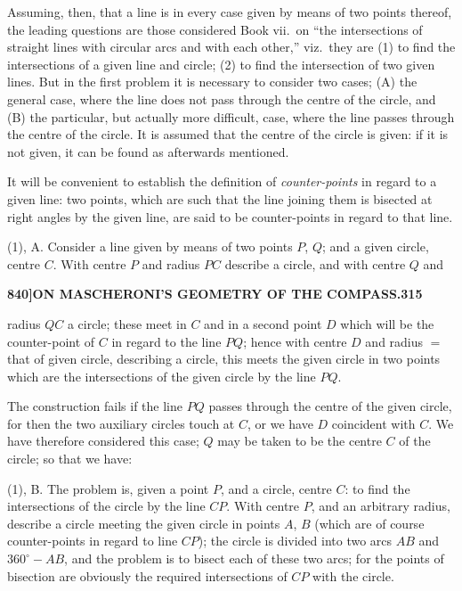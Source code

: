 \documentclass[11pt]{article}
\begin{document}
\medskip

Assuming, then, that a line is in every case given by means of two points thereof, the leading questions are those considered Book vii.\ on ``the intersections of straight lines with circular arcs and with each other,'' viz.\ they are (1) to find the intersections of a given line and circle; (2) to find the intersection of two given lines. But in the first problem it is necessary to consider two cases; (A) the general case, where the line does not pass through the centre of the circle, and (B) the particular, but actually more difficult, case, where the line passes through the centre of the circle. It is assumed that the centre of the circle is given: if it is not given, it can be found as afterwards mentioned.

\medskip

It will be convenient to establish the definition of \textit{counter-points} in regard to a given line: two points, which are such that the line joining them is bisected at right angles by the given line, are said to be counter-points in regard to that line.

\medskip

(1), A. Consider a line given by means of two points $P$, $Q$; and a given circle, centre $C$. With centre $P$ and radius $PC$ describe a circle, and with centre $Q$ and

\newpage

\noindent\textbf{840]}\hfill\textbf{ON MASCHERONI'S GEOMETRY OF THE COMPASS.}\hfill\textbf{315}

\bigskip

\noindent radius $QC$ a circle; these meet in $C$ and in a second point $D$ which will be the counter-point of $C$ in regard to the line $PQ$; hence with centre $D$ and radius $=$ that of given circle, describing a circle, this meets the given circle in two points which are the intersections of the given circle by the line $PQ$.

\medskip

The construction fails if the line $PQ$ passes through the centre of the given circle, for then the two auxiliary circles touch at $C$, or we have $D$ coincident with $C$. We have therefore considered this case; $Q$ may be taken to be the centre $C$ of the circle; so that we have:

\medskip

(1), B. The problem is, given a point $P$, and a circle, centre $C$: to find the intersections of the circle by the line $CP$. With centre $P$, and an arbitrary radius, describe a circle meeting the given circle in points $A$, $B$ (which are of course counter-points in regard to line $CP$); the circle is divided into two arcs $AB$ and $360^{\circ} - AB$, and the problem is to bisect each of these two arcs; for the points of bisection are obviously the required intersections of $CP$ with the circle.
\end{document}
